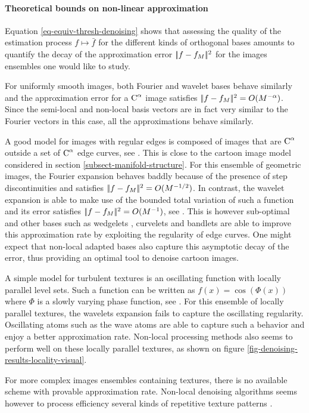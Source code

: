 \documentclass[final]{siamltex}
\newcommand{\F}{f}
\begin{document}
\paragraph{Theoretical bounds on non-linear approximation}

Equation \eqref{eq-equiv-thresh-denoising} shows that assessing the quality of the estimation process $\F \mapsto \bar f$ for the different kinds of orthogonal bases amounts to quantify the decay of the approximation error $|\!| f-f_M |\!|^2$ for the images ensembles one would like to study. 
\begin{rs}
	\item For uniformly smooth images, both Fourier and wavelet bases behave similarly and the approximation error for a $\text{C}^\alpha$ image satisfies $|\!| f-f_M |\!|^2 = O(M^{-\alpha})$. Since the semi-local and non-local basis vectors are in fact very similar to the Fourier vectors in this case, all the approximations behave similarly.
	\item A good model for images with regular edges is composed of images that are $\text{C}^\alpha$ outside a set of $\text{C}^\alpha$ edge curves, see \cite{donoho-wedglets}. This is close to the cartoon image model considered in section \ref{subsect-manifold-structure}. For this ensemble of geometric images, the Fourier expansion behaves baddly because of the presence of step discontinuities and satisfies $|\!| f-f_M |\!|^2 = O(M^{-1/2})$. In contrast, the wavelet expansion is able to make use of the bounded total variation of such a function and its error satisfies $|\!| f-f_M |\!|^2 = O(M^{-1})$, see \cite{mallat-book}. This is however sub-optimal and other bases such as wedgelets \cite{donoho-wedglets}, curvelets \cite{candes-tight-frame} and bandlets \cite{bandelets-siam,bandelets-peyre} are able to improve this approximation rate by exploiting the regularity of edge curves. One might expect that non-local adapted bases also capture this asymptotic decay of the error, thus providing an optimal tool to denoise cartoon images.
	\item A simple model for turbulent textures is an oscillating function with locally parallel level sets. Such a function can be written as $f(x) = \cos(\Phi(x))$ where $\Phi$ is a slowly varying phase function, see \cite{demanet-waveatoms}. For this ensemble of locally parallel textures, the wavelets expansion fails to capture the oscillating regularity. Oscillating atoms such as the wave atoms \cite{demanet-waveatoms} are able to capture such a behavior and enjoy a better approximation rate. Non-local processing methods also seems to perform well on these locally parallel textures, as shown on figure \ref{fig-denoising-results-locality-visual}.
	\item For more complex images ensembles containing textures, there is no available scheme with provable approximation rate. Non-local denoising algorithms seems however to process efficiency several kinds of repetitive texture patterns \cite{buades-nl-means}. 
\end{rs}
\end{document}
